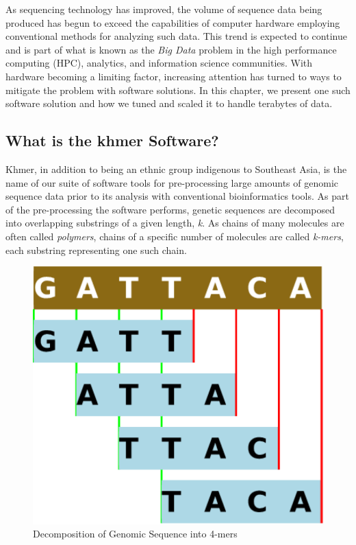 \documentclass{article}
\begin{document}
As sequencing technology has improved, the volume of sequence data being
produced has begun to exceed the capabilities of computer hardware employing
conventional methods for analyzing such data. This trend is expected to
continue and is part of what is known as the \textit{Big Data}
\citep{web:bigdata} problem in the high performance computing (HPC), analytics,
and information science communities. With hardware becoming a limiting factor,
increasing attention has turned to ways to mitigate the problem with software
solutions. In this chapter, we present one such software solution and how we
tuned and scaled it to handle terabytes of data.

\subsection{What is the khmer Software?}

Khmer, in addition to being an ethnic group indigenous to Southeast Asia, is
the name of our suite of software tools \citep{web:khmer} for pre-processing
large amounts of genomic sequence data prior to its analysis with conventional
bioinformatics tools. As part of the pre-processing the software performs,
genetic sequences are decomposed into overlapping substrings of a given length,
\textit{k}. As chains of many molecules are often called \textit{polymers},
chains of a specific number of molecules are called \textit{k-mers}, each
substring representing one such chain. 

\begin{figure}[ht!]
\centering
\includegraphics[scale=0.5]{kmers.pdf}
\caption{Decomposition of Genomic Sequence into 4-mers}
\label{kmers}
\end{figure}
\end{document}

